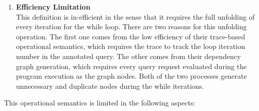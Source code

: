 {\begin{enumerate}
 It limits the adaptivity defined for the adaptive data analysis program to be w.r.t. one specific
 execution.
 In the other words, this adaptivity definition doesn't correspond to the \emph{adaptivity} for this program,
 but for the program in a certain execution.
 \item \textbf{Efficiency Limitation}
 \\
 This definition is in-efficient in the sense that it requires the full unfolding of every iteration for the while loop.
 There are two reasons for this unfolding operation.
 The first one comes from the low efficiency of their trace-based operational semantics,
 which requires the trace to track the loop iteration number in the annotated query.
 The other comes from their dependency graph generation, which requires every query request evaluated during the program execution
 as the graph nodes.
 Both of the two processes generate unnecessary and duplicate nodes during the while iterations.
\end{enumerate}
}This operational semantics is limited in the following aspects:
